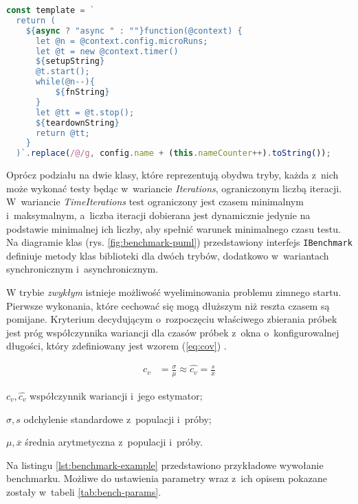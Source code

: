 \begin{lstlisting}[language=JavaScript, label=lst:benchmark-fn, caption=Kompozycja funkcji w~trybie \textit{extracted}.]
const template = `
  return (
    ${async ? "async " : ""}function(@context) {
      let @n = @context.config.microRuns;
      let @t = new @context.timer()
      ${setupString}
      @t.start();
      while(@n--){
          ${fnString}
      }
      let @tt = @t.stop();
      ${teardownString}
      return @tt;
    }
  )`.replace(/@/g, config.name + (this.nameCounter++).toString());
\end{lstlisting}

Oprócz podziału na dwie klasy, które reprezentują obydwa tryby, każda z~nich może wykonać testy będąc w~wariancie \textit{Iterations}, ograniczonym liczbą iteracji. W~wariancie \textit{TimeIterations} test ograniczony jest czasem minimalnym i~maksymalnym, a~liczba iteracji dobierana jest dynamicznie jedynie na podstawie minimalnej ich liczby, aby spełnić warunek minimalnego czasu testu. Na diagramie klas (rys. \ref{fig:benchmark-puml}) przedstawiony interfejs \lstinline{IBenchmark} definiuje metody klas biblioteki dla dwóch trybów, dodatkowo w~wariantach synchronicznym i~asynchronicznym.

W trybie \textit{zwykłym} istnieje możliwość wyeliminowania problemu zimnego startu. Pierwsze wykonania, które cechować się mogą dłuższym niż reszta czasem są pomijane. Kryterium decydującym o~rozpoczęciu właściwego zbierania próbek jest próg współczynnika wariancji dla czasów próbek z~okna o~konfigurowalnej długości, który zdefiniowany jest wzorem (\ref{eq:cov}) \cite{georges2007statistically}.

\begin{align}
 c_v &= \frac{\sigma}{\mu} \approx \widehat{c_v} = \frac{s}{\overline{x}} \label{eq:cov}
\end{align}
\begin{eqexpl}[1cm]
  \item{$c_v, \widehat{c_v}$} współczynnik wariancji i~jego estymator;
  \item{$\sigma, s$} odchylenie standardowe z~populacji i~próby;
  \item{$\mu, \overline{x}$} średnia arytmetyczna z~populacji i~próby.
\end{eqexpl}
\vspace{0.5cm}
Na listingu \ref{lst:benchmark-example} przedstawiono przykładowe wywołanie benchmarku. Możliwe do ustawienia parametry wraz z~ich opisem pokazane zostały w~tabeli \ref{tab:bench-params}.

